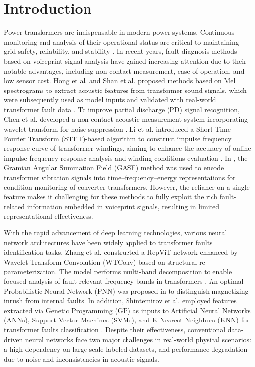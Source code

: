\documentclass[final,5p,times,twocolumn]{elsarticle}
\begin{document}
\section{Introduction}
Power transformers are indispensable in modern power systems. Continuous monitoring and analysis of their operational status are critical to maintaining grid safety, reliability, and stability \cite{HE2026119781,10492658}. In recent years, fault diagnosis methods based on voiceprint signal analysis have gained increasing attention due to their notable advantages, including non-contact measurement, ease of operation, and low sensor cost. Hong et al. and Shan et al. proposed methods based on Mel spectrograms to extract acoustic features from transformer sound signals, which were subsequently used as model inputs and validated with real-world transformer fault data \cite{a1,10606641}. To improve partial discharge (PD) signal recognition, Chen et al. developed a non-contact acoustic measurement system incorporating wavelet transform for noise suppression \cite{4265659}. Li et al. introduced a Short-Time Fourier Transform (STFT)-based algorithm to construct impulse frequency response curve of transformer windings, aiming to enhance the accuracy of online impulse frequency response analysis and winding conditions evaluation \cite{7558591}. In \cite{9760386}, the Gramian Angular Summation Field (GASF) method was used to encode transformer vibration signals into time–frequency–energy representations for condition monitoring of converter transformers. However, the reliance on a single feature makes it challenging for these methods to fully exploit the rich fault-related information embedded in voiceprint signals, resulting in limited representational effectiveness.

With the rapid advancement of deep learning technologies, various neural network architectures have been widely applied to transformer faults identification tasks. Zhang et al. constructed a RepViT network enhanced by Wavelet Transform Convolution (WTConv) based on structural re-parameterization. The model performs multi-band decomposition to enable focused analysis of fault-relevant frequency bands in transformers \cite{11014495}. An optimal Probabilistic Neural Network (PNN) was proposed in \cite{5352306} to distinguish magnetizing inrush from internal faults. In addition, Shintemirov et al. employed features extracted via Genetic Programming (GP) as inputs to Artificial Neural Networks (ANNs), Support Vector Machines (SVMs), and K-Nearest Neighbors (KNN) for transformer faults classification \cite{4717246}. Despite their effectiveness, conventional data-driven neural networks face two major challenges in real-world physical scenarios: a high dependency on large-scale labeled datasets, and performance degradation due to noise and inconsistencies in acoustic signals.
\end{document}
